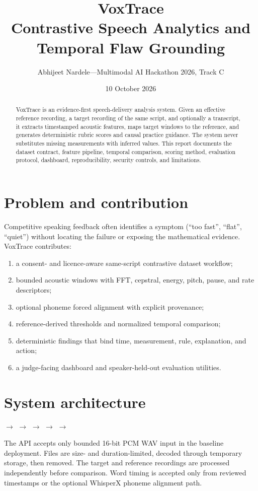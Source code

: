 \documentclass[10pt]{article}
\title{\vspace{-1.3cm}\textbf{VoxTrace}\\\large Contrastive Speech Analytics and Temporal Flaw Grounding}
\author{Abhijeet Nardele\quad---\quad Multimodal AI Hackathon 2026, Track C}
\date{10 October 2026}
\begin{document}
\maketitle
\vspace{-0.5cm}

\begin{abstract}
VoxTrace is an evidence-first speech-delivery analysis system. Given an effective reference recording, a target recording of the same script, and optionally a transcript, it extracts timestamped acoustic features, maps target windows to the reference, and generates deterministic rubric scores and causal practice guidance. The system never substitutes missing measurements with inferred values. This report documents the dataset contract, feature pipeline, temporal comparison, scoring method, evaluation protocol, dashboard, reproducibility, security controls, and limitations.
\end{abstract}

\section{Problem and contribution}
Competitive speaking feedback often identifies a symptom (``too fast'', ``flat'', ``quiet'') without locating the failure or exposing the mathematical evidence. VoxTrace contributes:
\begin{enumerate}
  \item a consent- and licence-aware same-script contrastive dataset workflow;
  \item bounded acoustic windows with FFT, cepstral, energy, pitch, pause, and rate descriptors;
  \item optional phoneme forced alignment with explicit provenance;
  \item reference-derived thresholds and normalized temporal comparison;
  \item deterministic findings that bind time, measurement, rule, explanation, and action;
  \item a judge-facing dashboard and speaker-held-out evaluation utilities.
\end{enumerate}

\section{System architecture}
\begin{center}
 $\rightarrow$  $\rightarrow$  $\rightarrow$  $\rightarrow$  $\rightarrow$ 
\end{center}
The API accepts only bounded 16-bit PCM WAV input in the baseline deployment. Files are size- and duration-limited, decoded through temporary storage, then removed. The target and reference recordings are processed independently before comparison. Word timing is accepted only from reviewed timestamps or the optional WhisperX phoneme alignment path.
\end{document}
